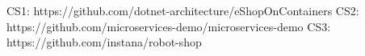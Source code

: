 CS1: https://github.com/dotnet-architecture/eShopOnContainers
CS2: https://github.com/microservices-demo/microservices-demo
CS3: https://github.com/instana/robot-shop


